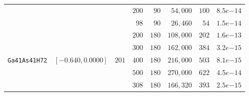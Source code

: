 \begin{tabular}{l|c|c|c|c|c|c|c}
 & & & $200$ & $\phantom{0}90$ & $\phantom{0}54,000$ & $100$ & $8.5e{-14}$ \\
 & & & $\phantom{0}98$ & $\phantom{0}90$ & $\phantom{0}26,460$ & $\phantom{0}54$ & $1.5e{-14}$ \\
 & & & $200$ & $180$ & $108,000$ & $202$ & $1.6e{-13}$ \\
 & & & $300$ & $180$ & $162,000$ & $384$ & $3.2e{-15}$ \\
\verb|Ga41As41H72| & $[-0.640,0.0000]$ & $201$ & $400$ & $180$ & $216,000$ & $503$ & $8.1e{-15}$ \\\hline
 & & & $500$ & $180$ & $270,000$ & $622$ & $4.5e{-14}$ \\
 & & & $308$ & $180$ & $166,320$ & $393$ & $2.5e{-15}$ \\
\end{tabular}
